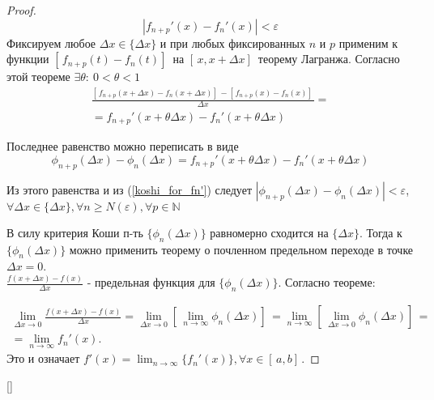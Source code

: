\begin{proof}
    \begin{equation}\label{koshi_for_fn'}
        |f_{n+p}'(x) - f_n'(x)| < \varepsilon
    \end{equation}
    Фиксируем любое $\Delta x \in \{\Delta x\}$ и при любых фиксированных $n$ и $p$ применим к функции  $[\,f_{n+p}(t)-f_n(t)]\,$ на $[\,x, x+\Delta x]\,$ теорему Лагранжа. 
    Согласно этой теореме $\exists \theta: \ 0 < \theta < 1$  
    \begin{align*}
        \frac{[\,f_{n+p}(x + \Delta x) - f_n(x + \Delta x)]\, - [\,f_{n+p}(x) - f_n(x)]\,}{\Delta x} = \\ = f_{n+p}'(x + \theta \Delta x) - f_n'(x + \theta \Delta x)
    \end{align*}

    Последнее равенство можно переписать в виде
    \begin{equation*}
        \phi_{n+p}(\Delta x) - \phi_n(\Delta x) = f_{n+p}'(x + \theta \Delta x) - f_n'(x + \theta \Delta x)
    \end{equation*}

    Из этого равенства и из (\ref{koshi_for_fn'}) следует $|\phi_{n+p}(\Delta x) - \phi_n(\Delta x)| < \varepsilon$, $\forall \Delta x \in \{\Delta x\}, \forall n \ge N(\varepsilon), \forall p \in \mathbb{N}$


    В силу критерия Коши п-ть $\{\phi_n(\Delta x)\}$ равномерно сходится на $\{\Delta x\}$. Тогда к $\{\phi_n(\Delta x)\}$ можно применить теорему о почленном предельном переходе в точке  $\Delta x = 0$. \\
    $\frac{f(x + \Delta x) - f(x)}{\Delta x}$ - предельная функция для $\{\phi_n(\Delta x)\}$. Согласно теореме:
  
    \begin{align*}
        \lim_{\Delta x \rightarrow 0}{\frac{f(x + \Delta x) - f(x)}{\Delta x}} = \lim_{\Delta x \rightarrow 0}{[\,\lim_{n \rightarrow \infty}{\phi_n(\Delta x)}]\,} = \lim_{n \rightarrow \infty}{[\,\lim_{\Delta x \rightarrow 0}{\phi_n(\Delta x)}]\,} = \\ = \lim_{n \rightarrow \infty}{f_n'(x)}.
    \end{align*}
    Это и означает $f'(x) = \lim_{n \rightarrow \infty}{\{f_n'(x)\}}, \forall x \in [\,a,b]\,$.
\end{proof}


[\cite{ilin_matan}]